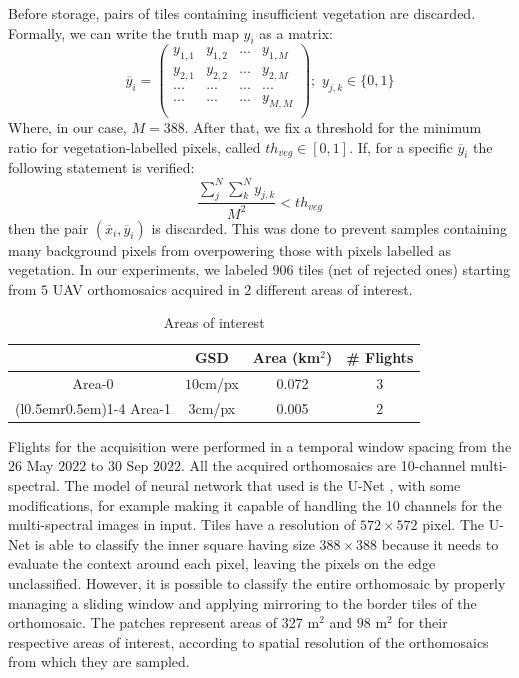 \documentclass[comsoc,final]{IEEEtran}
\begin{document}
Before storage, pairs of tiles containing insufficient vegetation are discarded.
Formally, we can write the truth map $y_i$ as a matrix:
\[
\overline{y}_i=\begin{pmatrix}
  y_{1,1} & y_{1,2} & ... &y_{1,M}\\ 
  y_{2,1} & y_{2,2} & ...&y_{2,M}\\
    ... & ... & ...& ...\\
    ... & ... & ...&y_{M,M}\\
\end{pmatrix};\,\, y_{j,k}\in\{0,1\}
\]
Where, in our case, $M=388$. After that, we fix a threshold for the minimum ratio for vegetation-labelled pixels, called $th_{veg}\in[0,1]$. If, for a specific $\overline{y}_i$ the following statement is verified:\[
\frac{\sum_{j}^N\sum_{k}^N y_{j,k}}{M^2}< th_{veg}
\] 
then the pair $(\overline{x}_i,\overline{y}_i)$ is discarded.
This was done to prevent samples containing many background pixels from overpowering those with pixels labelled as vegetation. 
In our experiments, we labeled $906$ tiles (net of rejected ones) starting from $5$ UAV orthomosaics acquired in $2$ different areas of interest.

\begin{table}[htbp]
  \centering
  \caption{Areas of interest}
  \label{tab:aoi}
  \begin{tabular}{c*{3}{c}}
\toprule
           & GSD     & Area (km$^2$)             & \# Flights  \\
    \midrule
    Area-0  & $10$cm/px& 0.072 & $3$  \\
    \cmidrule(l{0.5em}r{0.5em}){1-4}
    Area-1 & $3$cm/px & 0.005 & $ 2 $  \\
    \bottomrule
  \end{tabular}
\end{table}

Flights for the acquisition were performed in a temporal window spacing from the $26$ May $2022$ to $30$ Sep $2022$.
All the acquired orthomosaics are 10-channel multi-spectral.
The model of neural network that used is the U-Net \cite{ronneberger_u-net_2015}, with some modifications, for example making it capable of handling the 10 channels for the multi-spectral images in input. 
Tiles have a resolution of $572\times572$ pixel. The U-Net is able to classify the inner square having size $388\times388$ because it needs to evaluate the context around each pixel, leaving the pixels on the edge unclassified. However, it is possible to classify the entire orthomosaic by properly managing a sliding window and applying mirroring to the border tiles of the orthomosaic. The patches represent areas of 327 m$^2$  and $98$ m$^2$ for their respective areas of interest, according to spatial resolution of the orthomosaics from which they are sampled.
\end{document}

